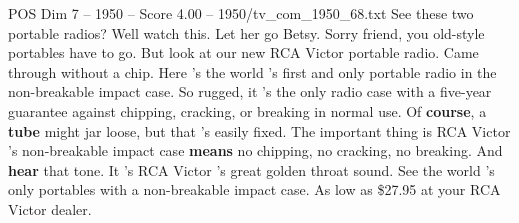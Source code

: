 \begin{textsample}{POS Dim 7 – 1950 – Score 4.00 – 1950/tv\_com\_1950\_68.txt}  \label{ex:f7_pos_005}
See these two portable radios?
Well watch this.
Let her go Betsy.
Sorry friend, you old-style portables have to go.
But look at our new RCA Victor portable radio.
Came through without a chip.
Here 's the world 's first and only portable radio in the non-breakable impact case.
So rugged, it 's the only radio case with a five-year guarantee against chipping, cracking, or breaking in normal use.
Of \textbf{course}, a \textbf{tube} might jar loose, but that 's easily fixed.
The important thing is RCA Victor 's non-breakable impact case \textbf{means} no chipping, no cracking, no breaking.
And \textbf{hear} that tone.
It 's RCA Victor 's great golden throat sound.
See the world 's only portables with a non-breakable impact case.
As low as \$27.95 at your RCA Victor dealer.

\end{textsample}
